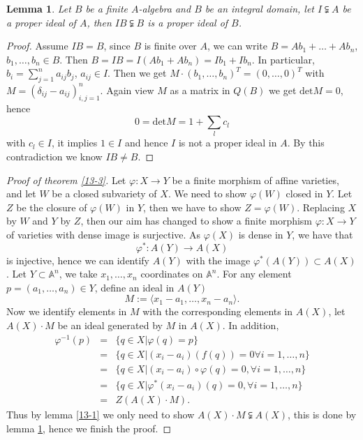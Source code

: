 \documentclass{amsart}
\theoremstyle{plain}
\newtheorem{lemma}{Lemma}
\theoremstyle{definition}
\theoremstyle{remark}
\numberwithin{equation}{section}
\begin{document}
  \begin{lemma}\label{13-2}
  	Let $ B $ be a finite $ A $-algebra and $ B $ be an integral domain, let $ I\subsetneqq A $ be a proper ideal of $ A $, then $ IB\subsetneqq B $ is a proper ideal of $ B $.
  \end{lemma}
  \begin{proof}
  	Assume $ IB = B$, since $ B $ is finite over $ A $, we can write $ B=Ab_1+\dots+Ab_n $, $ b_1,\dots,b_n\in B $. Then $ B=IB=I(Ab_1+Ab_n)=Ib_1+Ib_n $. In particular, $ b_i=\sum\limits_{j=1}^{n}a_{ij}b_j $, $ a_{ij}\in I $. Then we get $ M\cdot (b_1,\dots,b_n)^{T}=(0,\dots,0)^{T} $ with $ M=(\delta_{ij}-a_{ij})_{i,j=1}^{n} $. Again view $ M $ as a matrix in $ Q(B) $ we get $ \text{det}M=0 $, hence 
  	$$
  	0=\text{det}M=1+\sum\limits_{l}c_l 
  	$$
  	with $ c_l\in I $, it implies $ 1\in I $ and hence $ I $ is not a proper ideal in $ A $. By this contradiction we know $ IB\neq B $.
  \end{proof}
 \begin{proof}[Proof of theorem \ref{13-3}]
 	Let $ \varphi :X\to Y $ be a finite morphism of affine varieties, and let $ W $ be a closed subvariety of $ X $. We need  to show $ \varphi(W) $ closed in $ Y $. Let $ Z $ be the closure of $ \varphi(W) $ in $ Y $, then we have to show $ Z=\varphi(W) $. Replacing $ X $ by $ W $ and $ Y $ by $ Z $, then our aim has changed to show a finite morphism $ \varphi:X\to Y $ of varieties with dense image is surjective.
 	As $ \varphi (X) $ is dense in $ Y $, we have that 
 	$$
 	\varphi^{\ast}:A(Y)\to A(X)
 	$$
 	is injective, hence we can identify $ A(Y) $ with the image $ \varphi^{\ast}(A(Y))\subset A(X)$. Let $ Y\subset \mathbb{A}^n $, we take $ x_1,\dots,x_n $ coordinates on $ \mathbb{A}^n $. For any element $ p=(a_1,\dots,a_n)\in Y $, define an ideal in $ A(Y) $  
 	$$ M:=\langle x_1-a_1,\dots,x_n-a_n \rangle. $$
 	Now we identify elements in $ M $ with the corresponding elements in $ A(X) $, let $ A(X)\cdot M $ be an ideal generated by $ M $ in $ A(X) $. In addition, 
 	$$
 	\begin{array}{ccc}
 	\varphi^{-1}(p)  & = & \lbrace q\in X|\varphi(q)=p \rbrace\\
 	{ } & = & \lbrace q\in X|(x_i-a_i)(f(q))=0 \forall i=1,\dots,n \rbrace\\
 	{ } & = & \lbrace q\in X|(x_i-a_i)\circ \varphi (q)=0,\forall i=1,\dots,n \rbrace\\
 	{ } & = & \lbrace q\in X|\varphi^\ast(x_i-a_i)(q)=0,\forall i=1,\dots,n  \rbrace\\
 	{ } & = & Z(A(X)\cdot M).
 	\end{array}
 	$$
 	Thus by lemma \ref{13-1} we only need to show $ A(X)\cdot M \subsetneqq A(X)$, this is done by lemma \ref{13-2}, hence we finish the proof.
 \end{proof}
\end{document}
